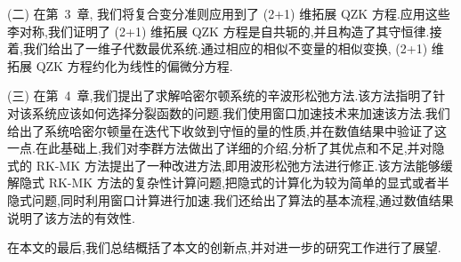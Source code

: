 (二) 在第~3~章, 我们将复合变分准则应用到了 (2+1) 维拓展 QZK 方程.应用这些李对称,我们证明了 (2+1) 维拓展 QZK 方程是自共轭的,并且构造了其守恒律.接着,我们给出了一维子代数最优系统.通过相应的相似不变量的相似变换, (2+1) 维拓展 QZK 方程约化为线性的偏微分方程.

(三) 在第~4~章,我们提出了求解哈密尔顿系统的辛波形松弛方法.该方法指明了针对该系统应该如何选择分裂函数的问题.我们使用窗口加速技术来加速该方法.我们给出了系统哈密尔顿量在迭代下收敛到守恒的量的性质,并在数值结果中验证了这一点.在此基础上,我们对李群方法做出了详细的介绍,分析了其优点和不足,并对隐式的 RK-MK 方法提出了一种改进方法,即用波形松弛方法进行修正.该方法能够缓解隐式 RK-MK 方法的复杂性计算问题,把隐式的计算化为较为简单的显式或者半隐式问题,同时利用窗口计算进行加速.我们还给出了算法的基本流程,通过数值结果说明了该方法的有效性.

在本文的最后,我们总结概括了本文的创新点,并对进一步的研究工作进行了展望.
